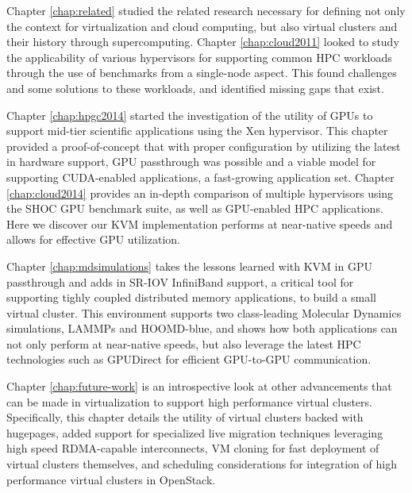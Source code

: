 
Chapter \ref{chap:related} studied the related research necessary for defining not only the context for virtualization and cloud computing, but also virtual clusters and their history through supercomputing.  Chapter \ref{chap:cloud2011} looked to study the applicability of various hypervisors for supporting common HPC workloads through the use of benchmarks from a single-node aspect.  This found challenges and some solutions to these workloads, and identified missing gaps that exist. 

Chapter \ref{chap:hpgc2014} started the investigation of the utility of GPUs to support mid-tier scientific applications using the Xen hypervisor. This chapter provided a proof-of-concept that with proper configuration by utilizing the latest in hardware support, GPU passthrough was possible and a viable model for supporting CUDA-enabled applications, a fast-growing application set. Chapter \ref{chap:cloud2014} provides an in-depth comparison of multiple hypervisors using the SHOC GPU benchmark suite, as well as GPU-enabled HPC applications. Here we discover our KVM implementation performs at near-native speeds and allows for effective GPU utilization. 

Chapter \ref{chap:mdsimulations} takes the lessons learned with KVM in GPU passthrough and adds in SR-IOV InfiniBand support, a critical tool for supporting tighly coupled distributed memory applications, to build a small virtual cluster. This environment supports two class-leading Molecular Dynamics simulations, LAMMPs and HOOMD-blue, and shows how both applications can not only perform at near-native speeds, but also leverage the latest HPC technologies such as GPUDirect for efficient GPU-to-GPU communication. %

Chapter \ref{chap:future-work} is an introspective look at other advancements that can be made in virtualization to support high performance virtual clusters. Specifically, this chapter details the utility of virtual clusters backed with hugepages, added support for specialized live migration techniques leveraging high speed RDMA-capable interconnects, VM cloning for fast deployment of virtual clusters themselves, and scheduling considerations for integration of high performance virtual clusters in OpenStack.  




